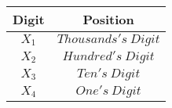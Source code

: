 
\begin{center}
    \begin{tabular}{|c|c|}
    \hline
	    \textbf{Digit}& \textbf{Position} \\ \hline
	    $X_{1}$ 		   & 	$Thousands's  \ Digit$	\\ \hline
	    $X_{2}$ 		   & 	$Hundred's  \ Digit$	\\ \hline
	    $X_{3}$ 		   & 	$Ten's \ Digit$	\\ \hline
	    $X_{4}$ 		   & 	$One's \ Digit$	\\ \hline
    \end{tabular}
    \end{center}

